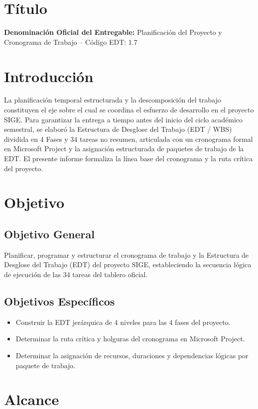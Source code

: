 \documentclass[12pt,a4paper]{article}
\begin{document}
\section{Título}
\textbf{Denominación Oficial del Entregable:} Planificación del Proyecto y Cronograma de Trabajo -- Código EDT: 1.7

\section{Introducción}
La planificación temporal estructurada y la descomposición del trabajo constituyen el eje sobre el cual se coordina el esfuerzo de desarrollo en el proyecto SIGE. Para garantizar la entrega a tiempo antes del inicio del ciclo académico semestral, se elaboró la Estructura de Desglose del Trabajo (EDT / WBS) dividida en 4 Fases y 34 tareas no resumen, articulada con un cronograma formal en Microsoft Project y la asignación estructurada de paquetes de trabajo de la EDT. El presente informe formaliza la línea base del cronograma y la ruta crítica del proyecto.

\section{Objetivo}
\subsection{Objetivo General}
Planificar, programar y estructurar el cronograma de trabajo y la Estructura de Desglose del Trabajo (EDT) del proyecto SIGE, estableciendo la secuencia lógica de ejecución de las 34 tareas del tablero oficial.
\subsection{Objetivos Específicos}
\begin{itemize}[leftmargin=1.5em, itemsep=2pt]
    \item Construir la EDT jerárquica de 4 niveles para las 4 fases del proyecto.
    \item Determinar la ruta crítica y holguras del cronograma en Microsoft Project.
    \item Determinar la asignación de recursos, duraciones y dependencias lógicas por paquete de trabajo.
\end{itemize}

\section{Alcance}
\end{document}
